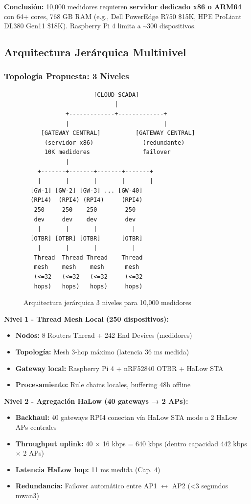 \textbf{Conclusión:} 10,000 medidores requieren \textbf{servidor dedicado x86 o ARM64} con 64+ cores, 768 GB RAM (e.g., Dell PowerEdge R750 \$15K, HPE ProLiant DL380 Gen11 \$18K). Raspberry Pi 4 limita a \textasciitilde300 dispositivos.

\subsection{Arquitectura Jerárquica Multinivel}

\subsubsection{Topología Propuesta: 3 Niveles}

\begin{figure}[h]
\centering
\begin{verbatim}
                    [CLOUD SCADA]
                          |
            +-------------+-------------+
            |                           |
     [GATEWAY CENTRAL]          [GATEWAY CENTRAL]
      (servidor x86)              (redundante)
      10K medidores               failover
            |
    +-------+-------+-------+-------+
    |       |       |       |       |
  [GW-1] [GW-2] [GW-3] ... [GW-40] 
  (RPi4)  (RPI4) (RPI4)     (RPI4)
   250     250    250        250
   dev     dev    dev        dev
    |       |       |          |
  [OTBR] [OTBR] [OTBR]      [OTBR]
    |       |       |          |
   Thread  Thread Thread    Thread
   mesh    mesh    mesh      mesh
   (<=32   (<=32   (<=32     (<=32
   hops)   hops)   hops)     hops)
\end{verbatim}
\caption{Arquitectura jerárquica 3 niveles para 10,000 medidores}
\label{fig:hierarchy-10k}
\end{figure}

\textbf{Nivel 1 - Thread Mesh Local (250 dispositivos):}
\begin{itemize}
\item \textbf{Nodos:} 8 Routers Thread + 242 End Devices (medidores)
\item \textbf{Topología:} Mesh 3-hop máximo (latencia 36 ms medida)
\item \textbf{Gateway local:} Raspberry Pi 4 + nRF52840 OTBR + HaLow STA
\item \textbf{Procesamiento:} Rule chains locales, buffering 48h offline
\end{itemize}

\textbf{Nivel 2 - Agregación HaLow (40 gateways → 2 APs):}
\begin{itemize}
\item \textbf{Backhaul:} 40 gateways RPI4 conectan vía HaLow STA mode a 2 HaLow APs centrales
\item \textbf{Throughput uplink:} 40 $\times$ 16 kbps = 640 kbps (dentro capacidad 442 kbps $\times$ 2 APs)
\item \textbf{Latencia HaLow hop:} 11 ms medida (Cap. 4)
\item \textbf{Redundancia:} Failover automático entre AP1 $\leftrightarrow$ AP2 (<3 segundos mwan3)
\end{itemize}

